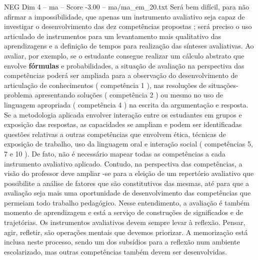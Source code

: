\begin{textsample}{NEG Dim 4 – ma – Score -3.00 – ma/ma\_em\_20.txt}
Será bem difícil, para não afirmar a impossibilidade, que apenas um instrumento avaliativo seja capaz de investigar o desenvolvimento das dez competências propostas ; será preciso o uso articulado de instrumentos para um levantamento mais qualitativo das aprendizagens e a definição de tempos para realização das sínteses avaliativas.
Ao avaliar, por exemplo, se o estudante consegue realizar um cálculo abstrato que envolve \textbf{fórmulas} e probabilidades, a situação de avaliação na perspectiva das competências poderá ser ampliada para a observação do desenvolvimento de articulação de conhecimentos ( competência 1 ), nas resoluções de situações-problema apresentando soluções ( competência 2 ) ou mesmo no uso de linguagem apropriada ( competência 4 ) na escrita da argumentação e resposta.
Se a metodologia aplicada envolver interação entre os estudantes em grupos e exposição das respostas, as capacidades se ampliam e podem ser identificadas questões relativas a outras competências que envolvem ética, técnicas de exposição de trabalho, uso da linguagem oral e interação social ( competências 5, 7 e 10 ).
De fato, não é necessário mapear todas as competências a cada instrumento avaliativo aplicado.
Contudo, na perspectiva das competências, a visão do professor deve ampliar -se para a eleição de um repertório avaliativo que possibilite a análise de fatores que são constitutivos das mesmas, até para que a avaliação seja mais uma oportunidade de desenvolvimento das competências que permeiam todo trabalho pedagógico.
Nesse entendimento, a avaliação é também momento de aprendizagem e está a serviço de construções de significados e de trajetórias.
Os instrumentos avaliativos devem sempre levar à reflexão.
Pensar, agir, refletir, são operações mentais que devemos priorizar.
A memorização está inclusa neste processo, sendo um dos subsídios para a reflexão num ambiente escolarizado, mas outras competências também devem ser desenvolvidas.

\end{textsample}
